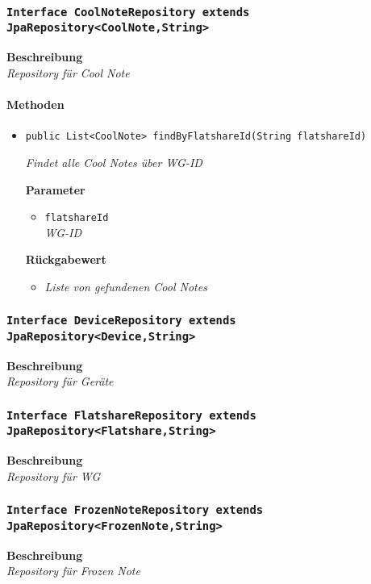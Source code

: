      \subsubsection{\texttt{Interface CoolNoteRepository extends JpaRepository<CoolNote,String>}}
     \textbf{Beschreibung} \\
     \textit{Repository für Cool Note}
     \paragraph*{Methoden}
     \begin{itemize}
     	\item{\texttt{public List<CoolNote> findByFlatshareId(String flatshareId)}}
     	
     	\textit{Findet alle Cool Notes über WG-ID}
     	
     	\textbf{Parameter}
     	\begin{itemize}
     		\item\texttt{flatshareId}\\
     		\textit{WG-ID}
     	\end{itemize}
     	
     	\textbf{Rückgabewert}
     	\begin{itemize}
     		\item\textit{Liste von gefundenen Cool Notes}
     	\end{itemize}
     \end{itemize}
 
     \subsubsection{\texttt{Interface DeviceRepository extends JpaRepository<Device,String>}}
     \textbf{Beschreibung} \\
     \textit{Repository für Geräte}
     \subsubsection{\texttt{Interface FlatshareRepository extends JpaRepository<Flatshare,String>}}
     \textbf{Beschreibung} \\
     \textit{Repository für WG}
     \subsubsection{\texttt{Interface FrozenNoteRepository extends JpaRepository<FrozenNote,String>}}
     \textbf{Beschreibung} \\
     \textit{Repository für Frozen Note}
